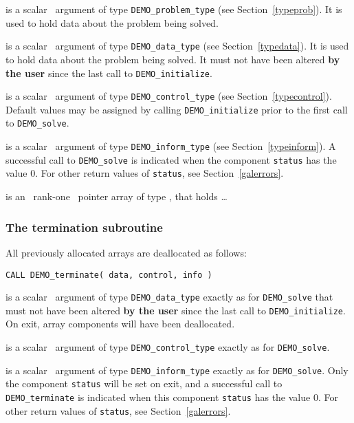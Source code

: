 \documentclass{galahad}
\newcommand{\packagename}{DEMO}
\begin{document}
\vspace*{-3mm}
\begin{description}
 is a scalar \intentinout\ argument of type 
{\tt \packagename\_problem\_type}
(see Section~\ref{typeprob}). 
It is used to hold data about the problem being solved.

 is a scalar \intentinout\ argument of type 
{\tt \packagename\_data\_type}
(see Section~\ref{typedata}). It is used to hold data about the problem being 
solved. It must not have been altered {\bf by the user} since the last call to 
{\tt \packagename\_initialize}.

 is a scalar \intentin\ argument of type 
{\tt \packagename\_control\_type}
(see Section~\ref{typecontrol}). Default values may be assigned by calling 
{\tt \packagename\_initialize} 
prior to the first call to 
{\tt \packagename\_solve}.

 is a scalar \intentout\ argument of type 
{\tt \packagename\_inform\_type}
(see Section~\ref{typeinform}). A successful call to
{\tt \packagename\_solve}
is indicated when the  component {\tt status} has the value 0. 
For other return values of {\tt status}, see Section~\ref{galerrors}.

 is an \optional\ rank-one \intentin\ pointer array of type 
 \realdp,  that holds \ldots

\end{description}


\subsubsection{The  termination subroutine}
All previously allocated arrays are deallocated as follows:
\vspace*{1mm}

\hspace{8mm}
{\tt CALL \packagename\_terminate( data, control, info )}

\vspace*{-3mm}
\begin{description}

 is a scalar \intentinout\ argument of type 
{\tt \packagename\_data\_type} 
exactly as for
{\tt \packagename\_solve}
that must not have been altered {\bf by the user} since the last call to 
{\tt \packagename\_initialize}.
On exit, array components will have been deallocated.

 is a scalar \intentin\ argument of type 
{\tt \packagename\_control\_type}
exactly as for
{\tt \packagename\_solve}.

 is a scalar \intentout\ argument of type 
{\tt \packagename\_inform\_type}
exactly as for
{\tt \packagename\_solve}.
Only the component {\tt status} will be set on exit, and a 
successful call to 
{\tt \packagename\_terminate}
is indicated when this  component {\tt status} has the value 0. 
For other return values of {\tt status}, see Section~\ref{galerrors}.

\end{description}
\end{document}
